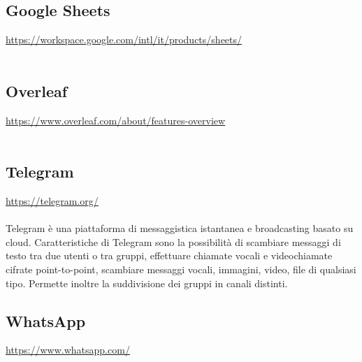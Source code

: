 \documentclass[a4paper,12pt]{article}
\begin{document}
\subsection{Google Sheets} \label{strumenti:googleSheets}
\underline{\url{https://workspace.google.com/intl/it/products/sheets/}} \\\\

\subsection{Overleaf} \label{strumenti:overleaf}
\underline{\url{https://www.overleaf.com/about/features-overview}} \\\\

\subsection{Telegram} \label{strumenti:telegram}
\underline{\url{https://telegram.org/}} \\\\
Telegram è una piattaforma di messaggistica istantanea e broadcasting basato su cloud. Caratteristiche di Telegram sono la possibilità di scambiare messaggi di testo tra due utenti o tra gruppi, effettuare chiamate vocali e videochiamate cifrate point-to-point, scambiare messaggi vocali, immagini, video, file di qualsiasi tipo. Permette inoltre la suddivisione dei gruppi in canali distinti.

\subsection{WhatsApp} \label{strumenti:whatsapp}
\underline{\url{https://www.whatsapp.com/}} \\\\
\end{document}
